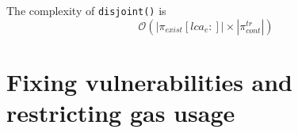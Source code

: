 

The complexity of \texttt{disjoint()} is
\[ \mathcal{O}(|\pi_{exist}[lca_{e}:]| \times
|\pi_{cont}^{tr}|) \]

\section{Fixing vulnerabilities and restricting gas usage}


